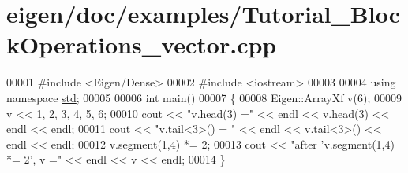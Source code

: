\hypertarget{eigen_2doc_2examples_2_tutorial___block_operations__vector_8cpp_source}{}\section{eigen/doc/examples/\+Tutorial\+\_\+\+Block\+Operations\+\_\+vector.cpp}
\label{eigen_2doc_2examples_2_tutorial___block_operations__vector_8cpp_source}

\begin{DoxyCode}
00001 \textcolor{preprocessor}{#include <Eigen/Dense>}
00002 \textcolor{preprocessor}{#include <iostream>}
00003 
00004 \textcolor{keyword}{using namespace }\hyperlink{namespacestd}{std};
00005 
00006 \textcolor{keywordtype}{int} main()
00007 \{
00008   Eigen::ArrayXf v(6);
00009   v << 1, 2, 3, 4, 5, 6;
00010   cout << \textcolor{stringliteral}{"v.head(3) ="} << endl << v.head(3) << endl << endl;
00011   cout << \textcolor{stringliteral}{"v.tail<3>() = "} << endl << v.tail<3>() << endl << endl;
00012   v.segment(1,4) *= 2;
00013   cout << \textcolor{stringliteral}{"after 'v.segment(1,4) *= 2', v ="} << endl << v << endl;
00014 \}
\end{DoxyCode}
